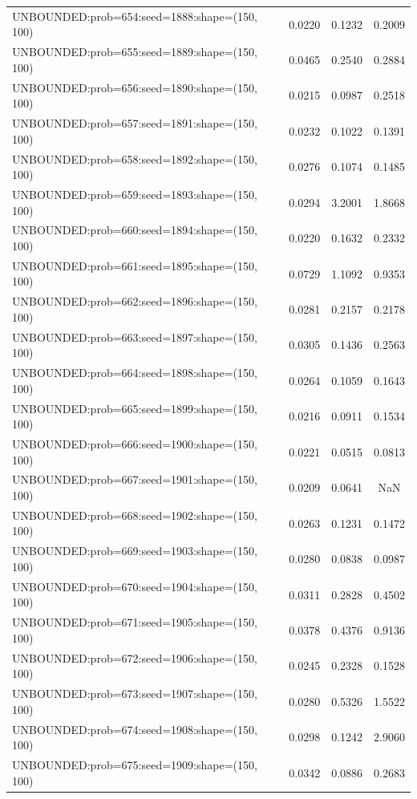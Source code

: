 \begin{longtable}{lccc}
UNBOUNDED:prob=654:seed=1888:shape=(150, 100) &   0.0220 &  0.1232 &  0.2009 \\
UNBOUNDED:prob=655:seed=1889:shape=(150, 100) &   0.0465 &  0.2540 &  0.2884 \\
UNBOUNDED:prob=656:seed=1890:shape=(150, 100) &   0.0215 &  0.0987 &  0.2518 \\
UNBOUNDED:prob=657:seed=1891:shape=(150, 100) &   0.0232 &  0.1022 &  0.1391 \\
UNBOUNDED:prob=658:seed=1892:shape=(150, 100) &   0.0276 &  0.1074 &  0.1485 \\
UNBOUNDED:prob=659:seed=1893:shape=(150, 100) &   0.0294 &  3.2001 &  1.8668 \\
UNBOUNDED:prob=660:seed=1894:shape=(150, 100) &   0.0220 &  0.1632 &  0.2332 \\
UNBOUNDED:prob=661:seed=1895:shape=(150, 100) &   0.0729 &  1.1092 &  0.9353 \\
UNBOUNDED:prob=662:seed=1896:shape=(150, 100) &   0.0281 &  0.2157 &  0.2178 \\
UNBOUNDED:prob=663:seed=1897:shape=(150, 100) &   0.0305 &  0.1436 &  0.2563 \\
UNBOUNDED:prob=664:seed=1898:shape=(150, 100) &   0.0264 &  0.1059 &  0.1643 \\
UNBOUNDED:prob=665:seed=1899:shape=(150, 100) &   0.0216 &  0.0911 &  0.1534 \\
UNBOUNDED:prob=666:seed=1900:shape=(150, 100) &   0.0221 &  0.0515 &  0.0813 \\
UNBOUNDED:prob=667:seed=1901:shape=(150, 100) &   0.0209 &  0.0641 &     NaN \\
UNBOUNDED:prob=668:seed=1902:shape=(150, 100) &   0.0263 &  0.1231 &  0.1472 \\
UNBOUNDED:prob=669:seed=1903:shape=(150, 100) &   0.0280 &  0.0838 &  0.0987 \\
UNBOUNDED:prob=670:seed=1904:shape=(150, 100) &   0.0311 &  0.2828 &  0.4502 \\
UNBOUNDED:prob=671:seed=1905:shape=(150, 100) &   0.0378 &  0.4376 &  0.9136 \\
UNBOUNDED:prob=672:seed=1906:shape=(150, 100) &   0.0245 &  0.2328 &  0.1528 \\
UNBOUNDED:prob=673:seed=1907:shape=(150, 100) &   0.0280 &  0.5326 &  1.5522 \\
UNBOUNDED:prob=674:seed=1908:shape=(150, 100) &   0.0298 &  0.1242 &  2.9060 \\
UNBOUNDED:prob=675:seed=1909:shape=(150, 100) &   0.0342 &  0.0886 &  0.2683 \\

\end{longtable}
